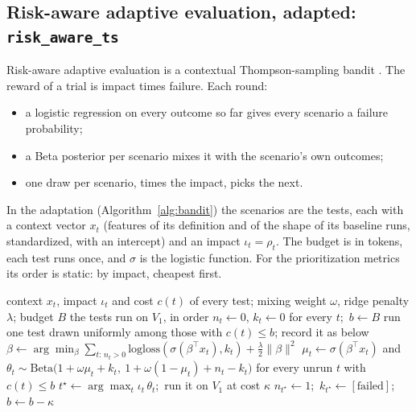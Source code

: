 \documentclass[11pt,a4paper]{article}
\newcommand{\strat}[1]{\texttt{#1}}
\begin{document}
\subsection{Risk-aware adaptive evaluation, adapted: \strat{risk\_aware\_ts}}

Risk-aware adaptive evaluation \cite{maji2026risk} is a contextual Thompson-sampling bandit
\cite{thompson1933likelihood,chapelle2011empirical}. The reward of a trial is impact times failure. Each round:
\begin{itemize}
  \item a logistic regression on every outcome so far gives every scenario a failure probability;
  \item a Beta posterior per scenario mixes it with the scenario's own outcomes;
  \item one draw per scenario, times the impact, picks the next.
\end{itemize}
In the adaptation (Algorithm~\ref{alg:bandit}) the scenarios are the tests, each with a context vector $x_t$
(features of its definition and of the shape of its baseline runs, standardized, with an intercept) and an impact
$\iota_t = \rho_t$. The budget is in tokens, each test runs once, and $\sigma$ is the logistic function. For the
prioritization metrics its order is static: by impact, cheapest first.

\begin{algorithm}[!htbp]
\caption{\strat{risk\_aware\_ts}}
\label{alg:bandit}
\begin{algorithmic}[1]
\Require context $x_t$, impact $\iota_t$ and cost $c(t)$ of every test; mixing weight $\omega$, ridge penalty
  $\lambda$; budget $B$
\Ensure the tests run on $V_1$, in order
\State $n_t \gets 0$, $k_t \gets 0$ for every $t$;\ $b \gets B$ 
\State run one test drawn uniformly among those with $c(t) \le b$; record it as below
  \State $\beta \gets \arg\min_\beta \sum_{t:\, n_t > 0} \mathrm{logloss}(\sigma(\beta^\top x_t), k_t)
    + \tfrac{\lambda}{2}\|\beta\|^2$ 
  \State $\mu_t \gets \sigma(\beta^\top x_t)$ and $\theta_t \sim \mathrm{Beta}\big(1 + \omega \mu_t + k_t,\
    1 + \omega (1 - \mu_t) + n_t - k_t\big)$ for every unrun $t$ with $c(t) \le b$
  \State $t^\star \gets \arg\max_t \iota_t\, \theta_t$;\ run it on $V_1$ at cost $\kappa$
  \State $n_{t^\star} \gets 1$;\ $k_{t^\star} \gets [\text{failed}]$;\ $b \gets b - \kappa$
\EndWhile
\end{algorithmic}
\end{algorithm}
\end{document}
